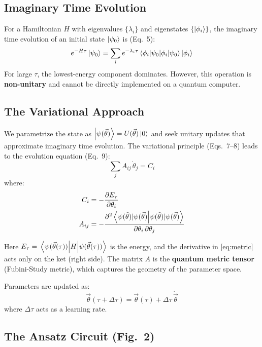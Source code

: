 \documentclass[11pt,a4paper]{article}
\begin{document}
\subsection{Imaginary Time Evolution}

For a Hamiltonian $H$ with eigenvalues $\{\lambda_i\}$ and eigenstates $\{\ket{\phi_i}\}$, the imaginary time evolution of an initial state $\ket{\psi_0}$ is (Eq.~5):
\begin{equation}
  e^{-H\tau}\ket{\psi_0} = \sum_i e^{-\lambda_i \tau} \braket{\phi_i|\psi_0}\ket{\phi_i}
  \label{eq:ite}
\end{equation}
For large $\tau$, the lowest-energy component dominates. However, this operation is \textbf{non-unitary} and cannot be directly implemented on a quantum computer.

\subsection{The Variational Approach}

We parametrize the state as $\ket{\psi(\vec{\theta})} = U(\vec{\theta})\ket{0}$ and seek unitary updates that approximate imaginary time evolution. The variational principle (Eqs.~7--8) leads to the evolution equation (Eq.~9):
\begin{equation}
  \boxed{\sum_j A_{ij}\,\dot{\theta}_j = C_i}
  \label{eq:vqite_update}
\end{equation}
where:
\begin{align}
  C_i &= -\frac{\partial E_\tau}{\partial \theta_i}
    \label{eq:gradient} \\
  A_{ij} &= -\frac{\partial^2 \braket{\psi(\tilde{\theta})|\psi(\vec{\theta})}}{\partial\theta_i\,\partial\theta_j}
    \label{eq:metric}
\end{align}

Here $E_\tau = \mel{\psi(\vec{\theta}(\tau))}{H}{\psi(\vec{\theta}(\tau))}$ is the energy, and the derivative in \eqref{eq:metric} acts only on the ket (right side). The matrix $A$ is the \textbf{quantum metric tensor} (Fubini-Study metric), which captures the geometry of the parameter space.

Parameters are updated as:
\begin{equation}
  \vec{\theta}(\tau + \Delta\tau) = \vec{\theta}(\tau) + \Delta\tau\,\dot{\vec{\theta}}
\end{equation}
where $\Delta\tau$ acts as a learning rate.

\subsection{The Ansatz Circuit (Fig.~2)}
\end{document}
